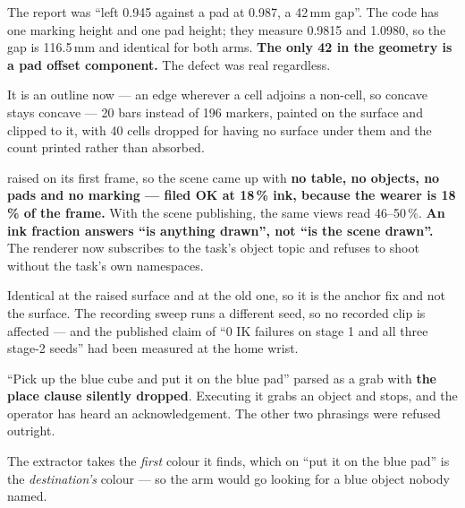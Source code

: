 {The report was ``left 0.945 against a pad at 0.987, a 42\,mm gap''. The code has
one marking height and one pad height; they measure 0.9815 and 1.0980, so the
gap is 116.5\,mm and identical for both arms. \textbf{The only 42 in the geometry
is a pad offset component.} The defect was real regardless.}

{It is an outline now --- an edge wherever a cell adjoins a non-cell, so concave
stays concave --- 20 bars instead of 196 markers, painted on the surface and
clipped to it, with 40 cells dropped for having no surface under them and the
count printed rather than absorbed.}

{ raised on its first frame, so the scene came up with \textbf{no
table, no objects, no pads and no marking --- filed OK at 18\,\% ink, because
the wearer is 18\,\% of the frame.} With the scene publishing, the same views
read 46--50\,\%. \textbf{An ink fraction answers ``is anything drawn'', not ``is
the scene drawn''.} The renderer now subscribes to the task's object topic and
refuses to shoot without the task's own namespaces.}

{Identical at the raised surface and at the old one, so it is the anchor fix and
not the surface. The recording sweep runs a different seed, so no recorded clip
is affected --- and the published claim of ``0 IK failures on stage 1 and all
three stage-2 seeds'' had been measured at the home wrist.}


{``Pick up the blue cube and put it on the blue pad'' parsed as a grab with
\textbf{the place clause silently dropped}. Executing it grabs an object and
stops, and the operator has heard an acknowledgement. The other two phrasings
were refused outright.}

{The extractor takes the \emph{first} colour it finds, which on ``put it on the
blue pad'' is the \emph{destination's} colour --- so the arm would go looking for
a blue object nobody named.}

